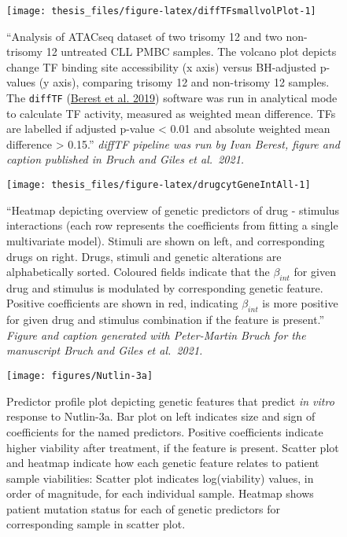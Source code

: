 \documentclass[11pt, a4paper, twosided]{book}
\begin{document}
\begin{figure}

{\centering \texttt{[image: thesis\_files/figure-latex/diffTFsmallvolPlot-1]} 

}

\caption{``Analysis of ATACseq dataset of two trisomy 12 and two non-trisomy 12 untreated CLL PMBC samples. The volcano plot depicts change TF binding site accessibility (x axis) versus BH-adjusted p-values (y axis), comparing trisomy 12 and non-trisomy 12 samples. The \texttt{diffTF} (\protect\hyperlink{ref-Berest2019}{Berest et al. 2019}) software was run in analytical mode to calculate TF activity, measured as weighted mean difference. TFs are labelled if adjusted p-value \textless{} 0.01 and absolute weighted mean difference \textgreater{} 0.15.'' \emph{diffTF pipeline was run by Ivan Berest, figure and caption published in Bruch and Giles et al.~2021.}}\label{fig:diffTFsmallvolPlot}
\end{figure}
\newpage


\begin{figure}

{\centering \texttt{[image: thesis\_files/figure-latex/drugcytGeneIntAll-1]} 

}

\caption{``Heatmap depicting overview of genetic predictors of drug - stimulus interactions (each row represents the coefficients from fitting a single multivariate model). Stimuli are shown on left, and corresponding drugs on right. Drugs, stimuli and genetic alterations are alphabetically sorted. Coloured fields indicate that the \(\beta_{int}\) for given drug and stimulus is modulated by corresponding genetic feature. Positive coefficients are shown in red, indicating \(\beta_{int}\) is more positive for given drug and stimulus combination if the feature is present.'' \emph{Figure and caption generated with Peter-Martin Bruch for the manuscript Bruch and Giles et al.~2021.}}\label{fig:drugcytGeneIntAll}
\end{figure}
\newpage


\begin{figure}

{\centering \texttt{[image: figures/Nutlin-3a]} 

}

\caption{Predictor profile plot depicting genetic features that predict \emph{in vitro} response to Nutlin-3a. Bar plot on left indicates size and sign of coefficients for the named predictors. Positive coefficients indicate higher viability after treatment, if the feature is present. Scatter plot and heatmap indicate how each genetic feature relates to patient sample viabilities: Scatter plot indicates log(viability) values, in order of magnitude, for each individual sample. Heatmap shows patient mutation status for each of genetic predictors for corresponding sample in scatter plot.}\label{fig:NutlinPredictors}
\end{figure}
\end{document}

